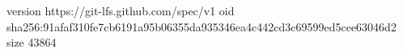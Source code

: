 version https://git-lfs.github.com/spec/v1
oid sha256:91afaf310fe7cb6191a95b06355da935346ea4c442cd3c69599ed5cee63046d2
size 43864
